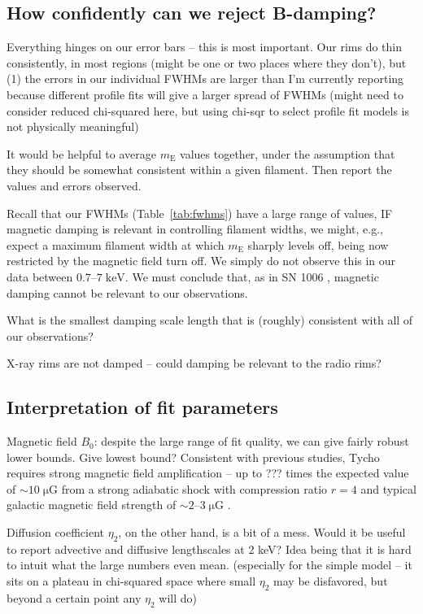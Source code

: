 \documentclass[iop, apj, numberedappendix, twocolappendix]{emulateapj}
\newcommand*{\mt}{\mathrm}
\newcommand*{\unit}[1]{\;\mt{#1}}  %
\newcommand*{\abt}{\mathord{\sim}} %
\newcommand*{\mE}{m_\mathrm{E}}
\begin{document}
\subsection{How confidently can we reject B-damping?}

Everything hinges on our error bars -- this is most important.  Our rims do
thin consistently, in most regions (might be one or two places where they
don't), but (1) the errors in our individual FWHMs are larger than I'm
currently reporting because different profile fits will give a larger spread of
FWHMs (might need to consider reduced chi-squared here, but using chi-sqr to
select profile fit models is not physically meaningful)

It would be helpful to average $\mE$ values together, under the
assumption that they should be somewhat consistent within a given filament.
Then report the values and errors observed.

Recall that our FWHMs (Table~\ref{tab:fwhms}) have a large range of values,
IF magnetic damping is relevant in controlling filament widths, we might, e.g.,
expect a maximum filament width at which $\mE$ sharply levels off, being now
restricted by the magnetic field turn off.  We simply do not observe this in
our data between $0.7$--$7 \unit{keV}$.  We must conclude that, as in SN 1006
, magnetic damping cannot be relevant to our
observations.

What is the smallest damping scale length that is (roughly) consistent with all
of our observations?

X-ray rims are not damped -- could damping be relevant to the radio rims?

\subsection{Interpretation of fit parameters}

Magnetic field $B_0$: despite the large range of fit quality, we can give
fairly robust lower bounds.  Give lowest bound?  Consistent with previous
studies, Tycho requires strong magnetic field amplification -- up to ??? times
the expected value of $\abt 10 \unit{\mu G}$ from a strong adiabatic shock with
compression ratio $r=4$ and typical galactic magnetic field strength of $\abt
2$--$3 \unit{\mu G}$ \citep{lyne1989, han2006}.

Diffusion coefficient $\eta_2$, on the other hand, is a bit of a mess.
Would it be useful to report advective and diffusive lengthscales at 2 keV?
Idea being that it is hard to intuit what the large numbers even mean.
(especially for the simple model -- it sits on a plateau in chi-squared space
where small $\eta_2$ may be disfavored, but beyond a certain point any $\eta_2$
will do)
\end{document}
